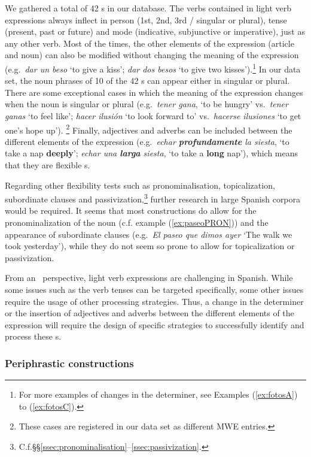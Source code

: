 \documentclass[output=paper]{langsci/langscibook}
\begin{document}
We gathered a total of 42 \lvc s in our database.
 The verbs contained in light verb expressions always inflect in person (1st, 2nd, 3rd / singular or plural), tense (present, past or future) and mode (indicative, subjunctive or imperative), just as any other verb.
Most of the times, the other elements of the expression (article and noun) can also be modified without changing the meaning of the expression (e.g.\ \textit{dar un beso} `to give a kiss'; \textit{dar dos besos} `to give two kisses').\footnote{For more examples of changes in the determiner, see Examples (\ref{ex:fotosA}) to (\ref{ex:fotosC}).}
In our data set, the noun phrases of 10 of the 42 \lvc s can appear either in singular or plural.
There are some exceptional cases in which the meaning of the expression changes when the noun is singular or plural (e.g.\ \textit{tener gana}, `to be hungry' vs.\ \textit{tener ganas} `to feel like'; \textit{hacer ilusión} `to look forward to' vs.\ \textit{hacerse ilusiones} `to get one's hope up').%
\footnote{These cases are registered in our data set as different MWE entries.}
Finally, adjectives and adverbs can be included between the different elements of the expression (e.g.\ \textit{echar \textbf{profundamente} la siesta}, `to take a nap \textbf{deeply}'; \textit{echar una \textbf{larga} siesta}, `to take a \textbf{long} nap'), which means that they are flexible \mwe s.

Regarding other flexibility tests such as pronominalisation, topicalization, subordinate clauses and passivization,\footnote{C.f.\@ §§\ref{ssec:pronominalisation}--\ref{ssec:passivization}.} further research in large Spanish corpora would be required.
It seems that most constructions do allow for the pronominalization of the noun (c.f. example (\ref{ex:paseoPRON})) and the appearance of subordinate clauses (e.g.\ \textit{El paseo que dimos ayer} `The walk we took yesterday'), while they do not seem so prone to allow for topicalization or passivization. 

From an \nlp\ perspective, light verb expressions are challenging in Spanish.
While some issues such as the verb tenses can be targeted specifically, some other issues require the usage of other processing strategies.
Thus, a change in the determiner or the insertion of adjectives and adverbs between the different elements of the expression will require the design of specific strategies to successfully identify and process these \mwe s.

\subsubsection{Periphrastic constructions}
\label{sssec:periphrasis}
\end{document}
